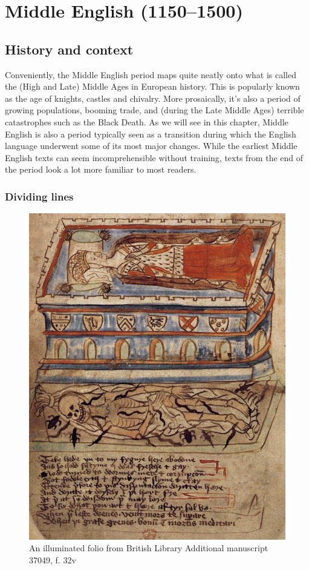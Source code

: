 \chapter{Middle English (1150--1500)}\label{ME}
\largerpage
\section{History and context}

Conveniently, the Middle English period maps quite neatly onto what is called the (High and Late) Middle Ages in European history. This is popularly known as the age of knights, castles and chivalry. More prosaically, it's also a period of growing populations, booming trade, and (during the Late Middle Ages) terrible catastrophes such as the Black Death. As we will see in this chapter, Middle English is also a period typically seen as a transition during which the English language underwent some of its most major changes. While the earliest Middle English texts can seem incomprehensible without training, texts from the end of the period look a lot more familiar to most readers.

\subsection{Dividing lines}

\begin{figure}
    \includegraphics[scale=0.655]{chapters/img/Transitory_tomb_-_1435-40.jpg}
    \caption{An illuminated folio from British Library Additional manuscript 37049, f. 32v}
    \label{fig:ME_transitory}
\end{figure}

